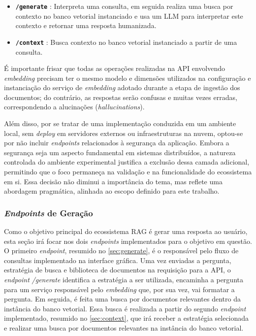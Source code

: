 \documentclass[a4paper, 12pt]{article}
\begin{document}
\begin{enumerate}
        \begin{itemize}
            \item \textbf{\texttt{/generate}} \label{sec:generate}: Interpreta uma consulta, em seguida realiza uma busca por contexto no banco vetorial instanciado e usa um LLM para interpretar este contexto e retornar uma resposta humanizada.
            \item \textbf{\texttt{/context}} \label{sec:context}: Busca contexto no banco vetorial instanciado a partir de uma consulta.
        \end{itemize}
    \end{enumerate}

    É importante frisar que todas as operações realizadas na API envolvendo \textit{embedding} precisam ter o mesmo modelo e dimensões utilizados na configuração e instanciação do serviço de \textit{embedding} adotado durante a etapa de ingestão dos documentos; do contrário, as respostas serão confusas e muitas vezes erradas, correspondendo a alucinações (\textit{hallucinations}).

    Além disso, por se tratar de uma implementação conduzida em um ambiente local, sem \textit{deploy} em servidores externos ou infraestruturas na nuvem, optou-se por não incluir \textit{endpoints} relacionados à segurança da aplicação. Embora a segurança seja um aspecto fundamental em sistemas distribuídos, a natureza controlada do ambiente experimental justifica a exclusão dessa camada adicional, permitindo que o foco permaneça na validação e na funcionalidade do ecossistema em si. Essa decisão não diminui a importância do tema, mas reflete uma abordagem pragmática, alinhada ao escopo definido para este trabalho.

    \subsubsection{\textit{Endpoints} de Geração}

    Como o objetivo principal do ecossistema RAG é gerar uma resposta ao usuário, esta seção irá focar nos dois \textit{endpoints} implementados para o objetivo em questão. O primeiro \textit{endpoint}, resumido no \autoref{sec:generate}, é o responsável pelo fluxo de consultas implementado na interface gráfica. Uma vez enviadas a pergunta, estratégia de busca e biblioteca de documentos na requisição para a API, o \textit{endpoint} \textit{/generate} identifica a estratégia a ser utilizada, encaminha a pergunta para um serviço responsável pelo \textit{embedding} que, por sua vez, vai formatar a pergunta. Em seguida, é feita uma busca por documentos relevantes dentro da instância do banco vetorial. Essa busca é realizada a partir do segundo \textit{endpoint} implementado, resumido no \autoref{sec:context}, que irá receber a estratégia selecionada e realizar uma busca por documentos relevantes na instância do banco vetorial.
\end{document}
